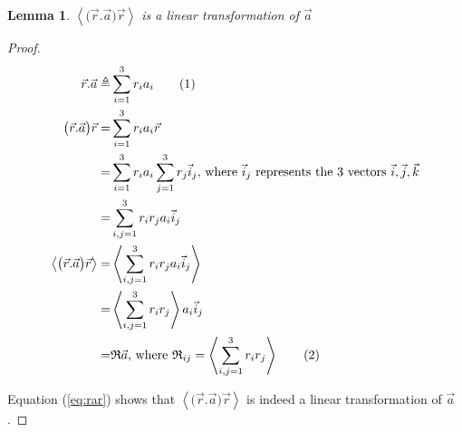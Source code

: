 \documentclass[]{article}
\newcommand\numberthis{\addtocounter{equation}{1}\tag{\theequation}}
\newtheorem{lemma}{Lemma}
\begin{document}
\begin{lemma}\label{lemma:linearity}
	$\left\langle \big(\vec{r}.\vec{a}\big)\vec{r} \right\rangle$ is a linear transformation of $\vec{a}$
\end{lemma}
\begin{proof}
\begin{align*}
\vec{r}.\vec{a} \triangleq& \sum_{i=1}^{3}r_ia_i\numberthis\label{eq:ra}\\
\big(\vec{r}.\vec{a}\big)\vec{r} =& \sum_{i=1}^{3}r_ia_i \vec{r}\\
=& \sum_{i=1}^{3}r_ia_i \sum_{j=1}^{3}r_j\vec{i}_j \text{, where $\vec{i}_j$ represents the 3 vectors $\vec{i},\vec{j},\vec{k}$}\\
=& \sum_{i,j=1}^{3}r_i  r_j a_i \vec{i}_j \\
\left\langle \big(\vec{r}.\vec{a}\big)\vec{r} \right\rangle=&\left\langle \sum_{i,j=1}^{3}r_i  r_j a_i \vec{i}_j\right\rangle\\
=&\left\langle \sum_{i,j=1}^{3}r_i  r_j\right\rangle a_i \vec{i}_j\\
=&\mathfrak{R} \vec{a}\text{, where } \mathfrak{R}_{ij}=\left\langle \sum_{i,j=1}^{3}r_i  r_j\right\rangle \numberthis\label{eq:rar}
\end{align*}

Equation (\ref{eq:rar}) shows that $\left\langle \big(\vec{r}.\vec{a}\big)\vec{r} \right\rangle$ is indeed a linear transformation of $\vec{a}$.
\end{proof}
\end{document}
